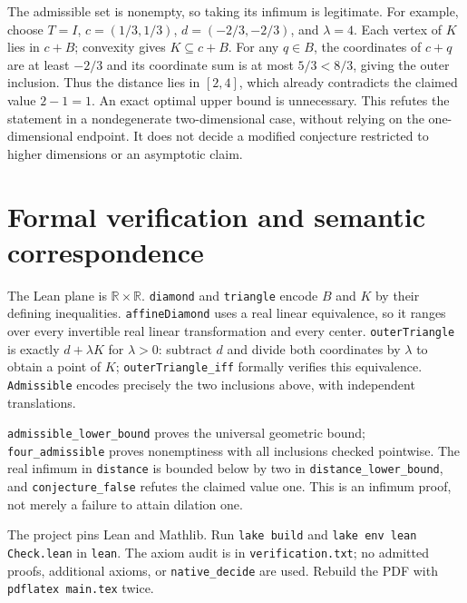 \documentclass[11pt]{article}
\begin{document}
\newpage
The admissible set is nonempty, so taking its infimum is legitimate.
For example, choose $T=I$, $c=(1/3,1/3)$, $d=(-2/3,-2/3)$, and
$\lambda=4$. Each vertex of $K$ lies in $c+B$; convexity gives
$K\subseteq c+B$. For any $q\in B$, the coordinates of $c+q$ are at least
$-2/3$ and its coordinate sum is at most $5/3<8/3$, giving the outer
inclusion. Thus the distance lies in $[2,4]$, which already contradicts
the claimed value $2-1=1$. An exact optimal upper bound is unnecessary.
This refutes the statement in a nondegenerate two-dimensional case,
without relying on the one-dimensional endpoint. It does not decide a
modified conjecture restricted to higher dimensions or an asymptotic claim.

\section{Formal verification and semantic correspondence}
The Lean plane is $\mathbb R\times\mathbb R$.
\texttt{diamond} and \texttt{triangle} encode $B$ and $K$ by their defining
inequalities. \texttt{affineDiamond} uses a real linear equivalence, so it
ranges over every invertible real linear transformation and every center.
\texttt{outerTriangle} is exactly $d+\lambda K$ for $\lambda>0$:
subtract $d$ and divide both coordinates by $\lambda$ to obtain a point
of $K$; \texttt{outerTriangle\_iff} formally verifies this equivalence.
\texttt{Admissible} encodes precisely the two inclusions above,
with independent translations.

\texttt{admissible\_lower\_bound} proves the universal geometric bound;
\texttt{four\_admissible} proves nonemptiness with all inclusions checked
pointwise. The real infimum in \texttt{distance} is bounded below by two
in \texttt{distance\_lower\_bound}, and \texttt{conjecture\_false} refutes
the claimed value one. This is an infimum proof, not merely a failure to
attain dilation one.

The project pins Lean and Mathlib. Run \texttt{lake build} and
\texttt{lake env lean Check.lean} in \texttt{lean}. The axiom audit is in
\texttt{verification.txt}; no admitted proofs, additional axioms, or
\texttt{native\_decide} are used. Rebuild the PDF with
\texttt{pdflatex main.tex} twice.
\end{document}
